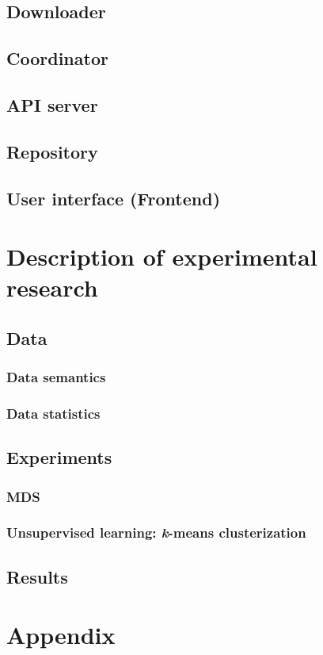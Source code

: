 \documentclass[a4paper,12pt]{article}
\begin{document}
    \subsection{Downloader}
    \subsection{Coordinator}
    \subsection{API server}
    \subsection{Repository}
    \subsection{User interface (Frontend)}
    
    \section{Description of experimental research}
    
    \subsection{Data}
    \subsubsection{Data semantics}
    \subsubsection{Data statistics}
   	\subsection{Experiments}
   	\subsubsection{MDS}
   	\subsubsection{Unsupervised learning: {\textit k-means} clusterization }
   	
   	\subsection{Results}
    
   
    \clearpage
    
    {}
    
        
    \clearpage
    
      
	\appendix
	\section{Appendix}
    
    
\end{document}
